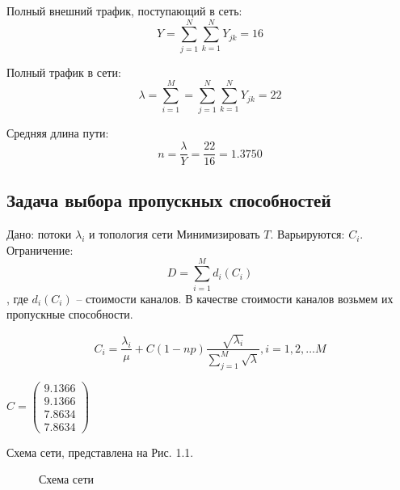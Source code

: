 \documentclass[14pt,a4paper,report]{report}
\begin{document}
Полный внешний трафик, поступающий в сеть:
$$ Y = \sum_{j=1}^N  \sum_{k=1}^N Y_{jk} =16 $$

Полный трафик в сети:
$$ \lambda = \sum_{i=1}^M = \sum_{j=1}^N  \sum_{k=1}^N Y_{jk} = 22 $$

Средняя длина пути:
$$ n = \frac{\lambda}{Y} =\frac{22}{16} = 1.3750
  $$




\subsection{Задача выбора пропускных способностей}


Дано: потоки ${\lambda_i}$ и топология сети
Минимизировать $T$.
Варьируются: ${C_i}$.
Ограничение:
$$ D= \sum_{i=1}^M d_i (C_i)$$
, где $d_i(C_i)$ – стоимости каналов. В качестве стоимости каналов возьмем их пропускные способности.

$$ C_i = \frac{\lambda_i}{\mu} + C(1-n p) \frac{\sqrt{\lambda_i}}{ \sum_{j=1}^M \sqrt{\lambda}},  i=1,2,… M$$ 



$C = \begin{pmatrix} 
9.1366 \\
9.1366 \\
7.8634 \\
7.8634 
\end{pmatrix}
\quad$



Схема сети, представлена на Рис. 1.1.

\begin{figure}[h!]
\caption{Схема сети}
\label{ris:image}
\end{figure}
\end{document}
